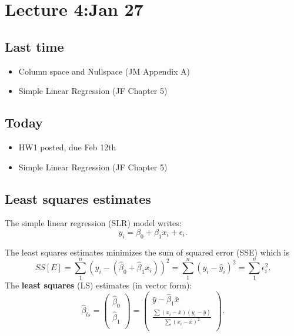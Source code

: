 \setcounter{section}{3}


\section{Lecture 4:Jan 27}


\subsection*{Last time}
\begin{itemize}
\item Column space and Nullspace (JM Appendix A)
\item Simple Linear Regression (JF Chapter 5)
\end{itemize}


\subsection*{Today}
\begin{itemize}
\item HW1 posted, due Feb 12th
\item Simple Linear Regression (JF Chapter 5)

\end{itemize}

\subsection*{Least squares estimates}

The simple linear regression (SLR) model writes:
$$
y_i = \beta_0 + \beta_1 x_i + \epsilon_i.
$$

The least squares estimates minimizes the sum of squared error (SSE)  which is 
$$
SS[E] = \sum\limits_{1}^{n}\left( y_i - (\hat{\beta}_0 + \hat{\beta}_1 x_i) \right)^2 = \sum\limits_{1}^{n}(y_i - \hat{y}_i)^2 = \sum\limits_{1}^{n}\epsilon_i^2.
$$
The {\bf least squares} (LS) estimates (in vector form):
$$
\hat{\beta}_{ls} = \left(
\begin{array}{l}
\hat{\beta}_0\\
\hat{\beta}_1\\
\end{array}
\right) =
\left(
\begin{array}{c}
\bar{y} - \hat{\beta}_1 \bar{x}\\
\frac{\sum(x_i - \bar{x})(y_i - \bar{y})}{\sum(x_i - \bar{x})^2}\\
\end{array}
\right).
$$

